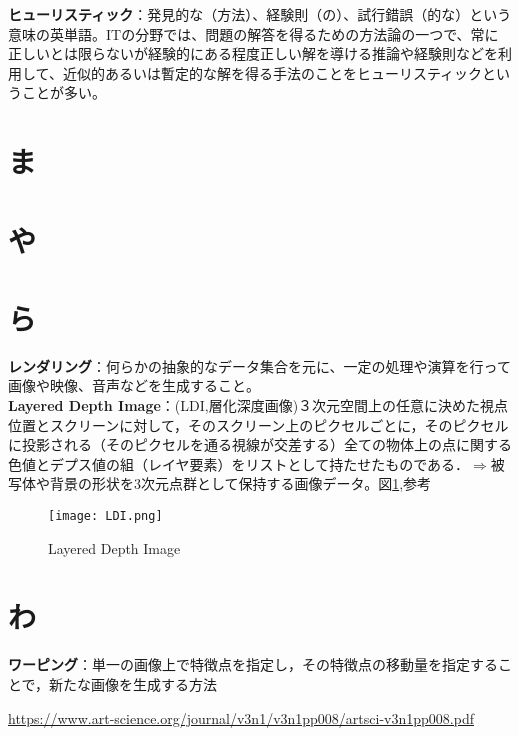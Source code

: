 \documentclass[a4paper,10pt,titlepage]{jsarticle}
\begin{document}
\textbf{ヒューリスティック}：発見的な（方法）、経験則（の）、試行錯誤（的な）という意味の英単語。ITの分野では、問題の解答を得るための方法論の一つで、常に正しいとは限らないが経験的にある程度正しい解を導ける推論や経験則などを利用して、近似的あるいは暫定的な解を得る手法のことをヒューリスティックということが多い。\\


\section{ま}

\section{や}

\section{ら}

\textbf{レンダリング}：何らかの抽象的なデータ集合を元に、一定の処理や演算を行って画像や映像、音声などを生成すること。\\
\quad \textbf{Layered Depth Image}：(LDI,層化深度画像)３次元空間上の任意に決めた視点位置とスクリーンに対して，そのスクリーン上のピクセルごとに，そのピクセルに投影される（そのピクセルを通る視線が交差する）全ての物体上の点に関する色値とデプス値の組（レイヤ要素）をリストとして持たせたものである．$\Rightarrow$被写体や背景の形状を3次元点群として保持する画像データ。図\ref{fig:LDI},参考\cite{url:LDI}
\begin{figure}[H]
 \begin{center}
  \texttt{[image: LDI.png]}
 \end{center}
 \caption{Layered Depth Image}
 \label{fig:LDI}
\end{figure}

\section{わ}

\textbf{ワーピング}：単一の画像上で特徴点を指定し，その特徴点の移動量を指定することで，新たな画像を生成する方法\\

\begin{comment}
\begin{itemize}
  \item
\end{itemize}

\end{comment}
\begin{thebibliography}{99}
   \url{https://www.art-science.org/journal/v3n1/v3n1pp008/artsci-v3n1pp008.pdf}
\end{thebibliography}
\end{document}
